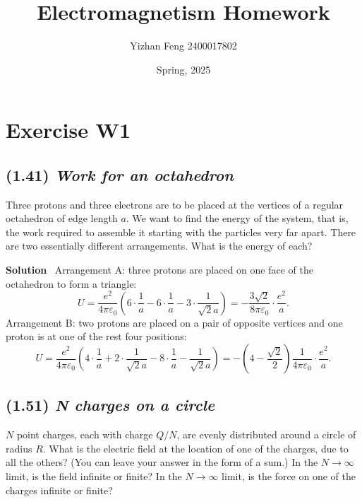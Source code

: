\documentclass[hidelinks]{article}
\title{\textbf{Electromagnetism Homework}}
\author{Yizhan Feng 2400017802}
\date{Spring, 2025}
\begin{document}
\hypersetup{bookmarksnumbered=true,}

\maketitle

\begin{Large}
\tableofcontents
\end{Large}%
\pagebreak



\section{Exercise W1}

\subsection{(1.41) \textit{Work for an octahedron}}
Three protons and three electrons are to be placed at the vertices of a regular octahedron of edge length $a$. We want to find the energy of the system, that is, the work required to assemble it starting with the particles very far apart. There are two essentially different arrangements. What is the energy of each?

\vspace{0.5cm}
\noindent
\textbf{Solution} \, Arrangement A: three protons are placed on one face of the octahedron to form a triangle:
$$U=\frac{e^2}{4\pi \varepsilon_0} \left(6\cdot\frac{1}{a} -6 \cdot \frac{1}{a} - 3\cdot \frac{1}{\sqrt{2}a} \right)= - \frac{3\sqrt{2}}{8\pi \varepsilon_0} \cdot \frac{e^2}{a}.$$
Arrangement B: two protons are placed on a pair of opposite vertices and one proton is at one of the rest four positions:
$$U=\frac{e^2}{4\pi \varepsilon_0} \left(4\cdot\frac{1}{a} + 2 \cdot \frac{1}{\sqrt{2}a} -8 \cdot \frac{1}{a} - \frac{1}{\sqrt{2}a} \right) = - \left(4- \frac{\sqrt{2}}{2}\right)\frac{1}{4\pi \varepsilon_0} \cdot \frac{e^2}{a}.$$


\subsection{(1.51) \textit{N charges on a circle}}
$N$ point charges, each with charge $Q/N$, are evenly distributed
around a circle of radius $R$. What is the electric field at the location of one of the charges, due to all the others? (You can leave
your answer in the form of a sum.) In the $N \to \infty$ limit, is the
field infinite or finite? In the $N \to \infty$ limit, is the force on one of the charges infinite or finite?
\end{document}
